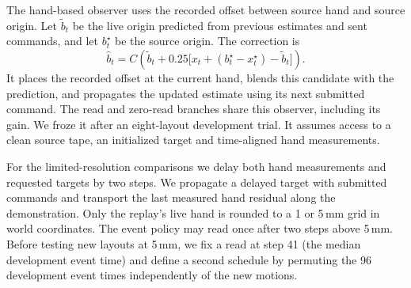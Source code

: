 The hand-based observer uses the recorded offset between source hand and source origin. Let $\tilde b_t$ be the live origin predicted from previous estimates and sent commands, and let $b_t^\star$ be the source origin. The correction is
\begin{equation}
 \hat b_t=C\!\left(\tilde b_t+0.25\big[x_t+(b_t^\star-x_t^\star)-\tilde b_t\big]\right).\label{eq:observer}
\end{equation}
It places the recorded offset at the current hand, blends this candidate with the prediction, and propagates the updated estimate using its next submitted command. The read and zero-read branches share this observer, including its gain. We froze it after an eight-layout development trial. It assumes access to a clean source tape, an initialized target and time-aligned hand measurements.

For the limited-resolution comparisons we delay both hand measurements and requested targets by two steps. We propagate a delayed target with submitted commands and transport the last measured hand residual along the demonstration. Only the replay's live hand is rounded to a 1 or 5\,mm grid in world coordinates. The event policy may read once after two steps above 5\,mm. Before testing new layouts at 5\,mm, we fix a read at step 41 (the median development event time) and define a second schedule by permuting the 96 development event times independently of the new motions.
